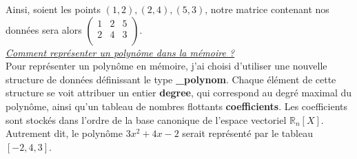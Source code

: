 \documentclass{report}
\begin{document}
Ainsi, soient les points $(1,2), (2,4), (5,3)$, notre matrice contenant nos données sera alors $\begin{pmatrix}
    1&2&5\\
    2&4&3\\
\end{pmatrix}$.\\
\underline{\textit{Comment représenter un polynôme dans la mémoire ?}}\vspace{4pt}\\
Pour représenter un polynôme en mémoire, j'ai choisi d'utiliser une nouvelle structure de données définissant le type \textbf{\_polynom}. Chaque élément de cette structure se voit attribuer un entier \textbf{degree}, qui correspond au degré maximal du polynôme, ainsi qu'un tableau de nombres flottants \textbf{coefficients}. Les coefficients sont stockés dans l'ordre de la base canonique de l'espace vectoriel $\mathbb{R}_n[X]$. Autrement dit, le polynôme $3x^2 + 4x - 2$ serait représenté par le tableau $[-2, 4, 3]$.\vspace{4pt}\\
\end{document}
